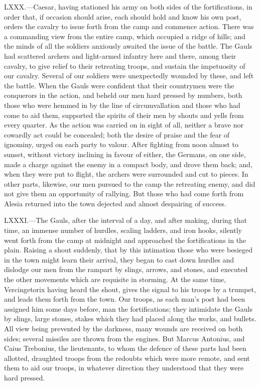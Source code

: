LXXX.—Caesar, having stationed his army on both sides of the
fortifications, in order that, if occasion should arise, each should
hold and know his own post, orders the cavalry to issue forth from the
camp and commence action. There was a commanding view from the entire
camp, which occupied a ridge of hills; and the minds of all the soldiers
anxiously awaited the issue of the battle. The Gauls had scattered
archers and light-armed infantry here and there, among their cavalry, to
give relief to their retreating troops, and sustain the impetuosity of
our cavalry. Several of our soldiers were unexpectedly wounded by these,
and left the battle. When the Gauls were confident that their countrymen
were the conquerors in the action, and beheld our men hard pressed by
numbers, both those who were hemmed in by the line of circumvallation
and those who had come to aid them, supported the spirits of their men
by shouts and yells from every quarter. As the action was carried on in
sight of all, neither a brave nor cowardly act could be concealed; both
the desire of praise and the fear of ignominy, urged on each party to
valour. After fighting from noon almost to sunset, without victory
inclining in favour of either, the Germans, on one side, made a charge
against the enemy in a compact body, and drove them back; and, when they
were put to flight, the archers were surrounded and cut to pieces. In
other parts, likewise, our men pursued to the camp the retreating enemy,
and did not give them an opportunity of rallying. But those who had come
forth from Alesia returned into the town dejected and almost despairing
of success.

LXXXI.—The Gauls, after the interval of a day, and after making, during
that time, an immense number of hurdles, scaling ladders, and iron
hooks, silently went forth from the camp at midnight and approached the
fortifications in the plain. Raising a shout suddenly, that by this
intimation those who were besieged in the town might learn their
arrival, they began to cast down hurdles and dislodge our men from the
rampart by slings, arrows, and stones, and executed the other movements
which are requisite in storming. At the same time, Vercingetorix having
heard the shout, gives the signal to his troops by a trumpet, and leads
them forth from the town. Our troops, as each man's post had been
assigned him some days before, man the fortifications; they intimidate
the Gauls by slings, large stones, stakes which they had placed along
the works, and bullets. All view being prevented by the darkness, many
wounds are received on both sides; several missiles are thrown from the
engines. But Marcus Antonius, and Caius Trebonius, the lieutenants, to
whom the defence of these parts had been allotted, draughted troops from
the redoubts which were more remote, and sent them to aid our troops, in
whatever direction they understood that they were hard pressed.

